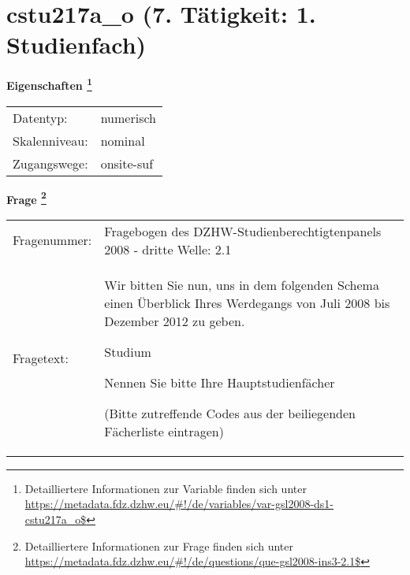 
    \setcounter{footnote}{0}

    \vspace*{-1.8cm}
	\section{cstu217a\_o (7. Tätigkeit: 1. Studienfach)}
	\label{section:cstu217a_o}



    \vspace*{0.5cm}
    \noindent\textbf{Eigenschaften
	\footnote{Detailliertere Informationen zur Variable finden sich unter
		\url{https://metadata.fdz.dzhw.eu/\#!/de/variables/var-gsl2008-ds1-cstu217a_o$}}}\\
	\begin{tabularx}{\hsize}{@{}lX}
	Datentyp: & numerisch \\
	Skalenniveau: & nominal \\
	Zugangswege: &
	  onsite-suf
 \\
    \end{tabularx}



				\vspace*{0.5cm}
                \noindent\textbf{Frage
	                \footnote{Detailliertere Informationen zur Frage finden sich unter
		              \url{https://metadata.fdz.dzhw.eu/\#!/de/questions/que-gsl2008-ins3-2.1$}}}\\
				\begin{tabularx}{\hsize}{@{}lX}
					Fragenummer: &
					  Fragebogen des DZHW-Studienberechtigtenpanels 2008 - dritte Welle:
					  2.1
 \\
					Fragetext: & Wir bitten Sie nun, uns in dem folgenden Schema einen Überblick Ihres Werdegangs von Juli 2008 bis Dezember 2012 zu geben.\par  Studium\par  Nennen Sie bitte Ihre Hauptstudienfächer\par  (Bitte zutreffende Codes aus der beiliegenden Fächerliste eintragen) \\
				\end{tabularx}





